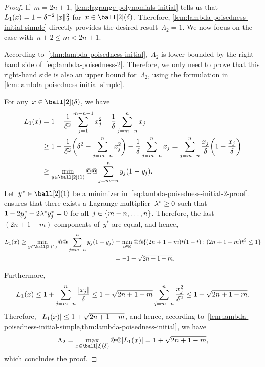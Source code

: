 \begin{proof}
    If~$m = 2n + 1$, \cref{lem:lagrange-polynomials-initial} tells us that~$\lagp[1](\iter) = 1 - \delta^{-2} \norm{x}_2^2$ for~$\iter \in \ball[2](\delta)$.
    Therefore, \cref{lem:lambda-poisedness-initial-simple} directly provides the desired result~$\Lambda_2 = 1$.
    We now focus on the case with~$n + 2 \le m < 2n + 1$.

    According to~\cref{thm:lambda-poisedness-initial},~$\Lambda_2$ is lower bounded by the right-hand side of~\cref{eq:lambda-poisedness-2}.
    Therefore, we only need to prove that this right-hand side is also an upper bound for~$\Lambda_2$, using the formulation in \cref{lem:lambda-poisedness-initial-simple}.
    
    For any~$\iter \in \ball[2](\delta)$, we have
    \begin{subequations}
        \begin{align}
            \lagp[1](\iter) &= 1 - \frac{1}{\delta^2} \sum_{j = 1}^{m - n - 1} x_j^2 - \frac{1}{\delta} \sum_{j = m - n}^n x_j\\
                            &\ge 1 - \frac{1}{\delta^2} \bigg( \delta^2 - \sum_{j = m - n}^n x_j^2 \bigg) - \frac{1}{\delta} \sum_{j = m - n}^n x_j = \sum_{j = m - n}^n \frac{x_j}{\delta} \bigg( 1 - \frac{x_j}{\delta} \bigg)\\
                            &\ge \min_{y \in \ball[2](1)} @@ \sum_{j = m - n}^n y_j (1 - y_j). \label{eq:lambda-poisedness-initial-2-proof}
        \end{align}
    \end{subequations}
    Let~$y^{\ast} \in \ball[2](1)$ be a minimizer in~\cref{eq:lambda-poisedness-initial-2-proof}.
     ensures that there exists a Lagrange multiplier~$\lm[\ast] \ge 0$ such that~$1 - 2 y_j^{\ast} + 2 \lm[\ast] y_j^{\ast} = 0$ for all~$j \in \{m - n, \dots, n\}$.
    Therefore, the last~$(2n + 1 - m)$ components of~$y^{\ast}$ are equal, and hence,
    \begin{align*}
        \lagp[1](\iter) \ge \min_{y \in \ball[2](1)} @@ \sum_{j = m - n}^n y_j (1 - y_j)    & = \min_{t \in \R} @@ \set{(2n + 1 - m) t (1 - t) : (2n + 1 - m) t^2 \le 1}\\
                                                                                            & = -1 - \sqrt{2n + 1 - m}.
    \end{align*}

    Furthermore,
    \begin{equation*}
        \lagp[1](\iter) \le 1 + \sum_{j = m - n}^n \frac{\abs{x_j}}{\delta} \le 1 + \sqrt{2n + 1 - m} \sum_{j = m - n}^n \frac{x_j^2}{\delta^2} \le 1 + \sqrt{2n + 1 - m}.
    \end{equation*}
    Therefore,~$\abs{\lagp[1](\iter)} \le 1 + \sqrt{2n + 1 - m}$, and hence, according to~\cref{lem:lambda-poisedness-initial-simple,thm:lambda-poisedness-initial}, we have
    \begin{equation*}
        \Lambda_2 = \max_{\iter \in \ball[2](\delta)} @@ \abs{\lagp[1](\iter)} = 1 + \sqrt{2n + 1 - m},
    \end{equation*}
    which concludes the proof.
\end{proof}

